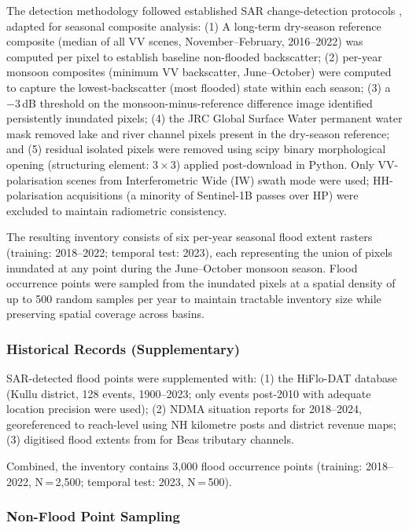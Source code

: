 The detection methodology followed established SAR change-detection protocols
\citep{martinis2018sar}, adapted for seasonal composite analysis:
(1) A long-term dry-season reference composite (median of all VV scenes,
November--February, 2016--2022) was computed per pixel to establish
baseline non-flooded backscatter;
(2) per-year monsoon composites (minimum VV backscatter, June--October)
were computed to capture the lowest-backscatter (most flooded) state
within each season;
(3) a $-3$\,dB threshold on the monsoon-minus-reference difference image
identified persistently inundated pixels;
(4) the JRC Global Surface Water permanent water mask \citep{pekel2016jrc}
removed lake and river channel pixels present in the dry-season reference;
and (5) residual isolated pixels were removed using scipy binary morphological
opening (structuring element: $3{\times}3$) applied post-download in Python.
Only VV-polarisation scenes from Interferometric Wide (IW) swath mode were
used; HH-polarisation acquisitions (a minority of Sentinel-1B passes over HP)
were excluded to maintain radiometric consistency.

The resulting inventory consists of six per-year seasonal flood extent rasters
(training: 2018--2022; temporal test: 2023), each representing the union of
pixels inundated at any point during the June--October monsoon season.
Flood occurrence points were sampled from the inundated pixels at a spatial
density of up to 500 random samples per year to maintain tractable inventory
size while preserving spatial coverage across basins.

\subsubsection{Historical Records (Supplementary)}
\label{sec:historical_inventory}

SAR-detected flood points were supplemented with:
(1) the HiFlo-DAT database \citep{hiflodot2025} (Kullu district, 128 events,
1900--2023; only events post-2010 with adequate location precision were used);
(2) NDMA situation reports for 2018--2024, georeferenced to reach-level
using NH kilometre posts and district revenue maps;
(3) digitised flood extents from \citet{inventories2020beas}
for Beas tributary channels.

Combined, the inventory contains 3,000 flood occurrence points
(training: 2018--2022, N\,=\,2,500; temporal test: 2023, N\,=\,500).

\subsubsection{Non-Flood Point Sampling}
\label{sec:nonfloods}

